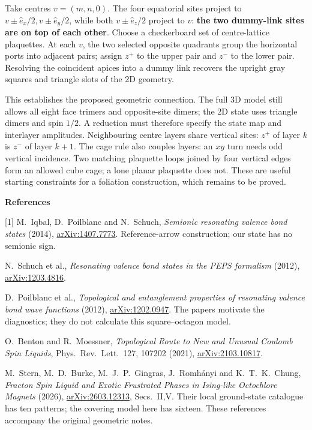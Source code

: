 \documentclass[10pt,a4paper]{article}
\begin{document}
Take centres $v=(m,n,0)$. The four equatorial sites project to
$v\pm\hat e_x/2,v\pm\hat e_y/2$, while both $v\pm\hat e_z/2$ project to $v$:
\textbf{the two dummy-link sites are on top of each other}. Choose a checkerboard
set of centre-lattice plaquettes. At each $v$, the two selected opposite quadrants
group the horizontal ports into adjacent pairs; assign $z^+$ to the upper pair
and $z^-$ to the lower pair. Resolving the coincident apices into a dummy link
recovers the upright gray squares and triangle slots of the 2D geometry.

This establishes the proposed geometric connection. The full 3D model still
allows all eight face trimers and opposite-site dimers; the 2D state uses triangle
dimers and spin $1/2$. A reduction must therefore specify the state map and
interlayer amplitudes. Neighbouring centre layers share vertical sites:
$z^+$ of layer $k$ is $z^-$ of layer $k+1$. The cage rule also couples layers: an $xy$ turn needs odd
vertical incidence. Two matching plaquette loops joined by four vertical edges
form an allowed cube cage; a lone planar plaquette does not. These are useful
starting constraints for a foliation construction, which remains to be proved.

\textbf{References}
{\footnotesize
[1] M.~Iqbal, D.~Poilblanc and N.~Schuch, \emph{Semionic resonating valence bond states}
(2014), \href{https://arxiv.org/abs/1407.7773}{arXiv:1407.7773}. Reference-arrow construction;
our state has no semionic sign.\par
[2] N.~Schuch et al., \emph{Resonating valence bond states in the PEPS formalism}
(2012), \href{https://arxiv.org/abs/1203.4816}{arXiv:1203.4816}.\par
[3] D.~Poilblanc et al., \emph{Topological and entanglement properties of resonating
valence bond wave functions} (2012), \href{https://arxiv.org/abs/1202.0947}{arXiv:1202.0947}.
The papers motivate the diagnostics; they do not calculate this square--octagon model.\par
[4] O.~Benton and R.~Moessner, \emph{Topological Route to New and Unusual Coulomb Spin
Liquids}, Phys.~Rev.~Lett.~127, 107202 (2021),
\href{https://arxiv.org/abs/2103.10817}{arXiv:2103.10817}.\par
[5] M.~Stern, M.~D.~Burke, M.~J.~P.~Gingras, J.~Romh\'anyi and K.~T.~K.~Chung,
\emph{Fracton Spin Liquid and Exotic Frustrated Phases in Ising-like Octochlore
Magnets} (2026), \href{https://arxiv.org/abs/2603.12313}{arXiv:2603.12313},
Secs.~II,V. Their local ground-state catalogue has ten patterns; the covering
model here has sixteen. These references accompany the original geometric notes.}
\end{document}

